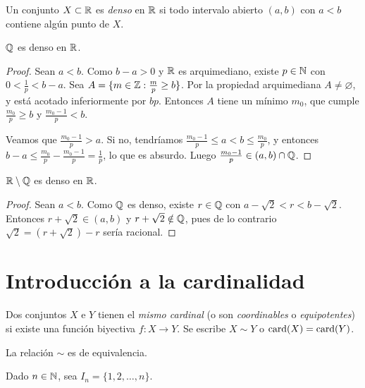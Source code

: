 \begin{definition}
  Un conjunto \(X \subset \mathbb{R}\) es \emph{denso} en \(\mathbb{R}\) si todo intervalo abierto \((a, b)\) con \(a < b\) contiene algún punto de \(X\).
\end{definition}

\begin{prop}
  \(\mathbb{Q}\) es denso en \(\mathbb{R}\).
\end{prop}

\begin{proof}
  Sean \(a < b\). Como \(b - a > 0\) y \(\mathbb{R}\) es arquimediano, existe \(p \in \mathbb{N}\) con \(0 < \frac{1}{p} < b - a\). Sea \(A = \{ m \in \mathbb{Z} : \frac{m}{p} \geq b \}\). Por la propiedad arquimediana \(A \neq \varnothing\), y está acotado inferiormente por \(bp\). Entonces \(A\) tiene un mínimo \(m_0\), que cumple \(\frac{m_0}{p} \geq b\) y \(\frac{m_0 - 1}{p} < b\).

  Veamos que \(\frac{m_0 - 1}{p} > a\). Si no, tendríamos \(\frac{m_0 - 1}{p} \leq a < b \leq \frac{m_0}{p}\), y entonces \(b - a \leq \frac{m_0}{p} - \frac{m_0 - 1}{p} = \frac{1}{p}\), lo que es absurdo. Luego \(\frac{m_0 - 1}{p} \in (a, b) \cap \mathbb{Q}\).
\end{proof}

\begin{prop}
  \(\mathbb{R} \setminus \mathbb{Q}\) es denso en \(\mathbb{R}\).
\end{prop}

\begin{proof}
  Sean \(a < b\). Como \(\mathbb{Q}\) es denso, existe \(r \in \mathbb{Q}\) con \(a - \sqrt{2} < r < b - \sqrt{2}\). Entonces \(r + \sqrt{2} \in (a, b)\) y \(r + \sqrt{2} \notin \mathbb{Q}\), pues de lo contrario \(\sqrt{2} = (r + \sqrt{2}) - r\) sería racional.
\end{proof}

\section{Introducción a la cardinalidad}

\begin{definition}[Equipotencia]
  Dos conjuntos \(X\) e \(Y\) tienen el \emph{mismo cardinal} (o son \emph{coordinables} o \emph{equipotentes}) si existe una función biyectiva \(f\colon X \to Y\). Se escribe \(X \sim Y\) o \(\operatorname{card}(X) = \operatorname{card}(Y)\).
\end{definition}

La relación \(\sim\) es de equivalencia.

Dado \(n \in \mathbb{N}\), sea \(I_n = \{1, 2, \dots, n\}\).

